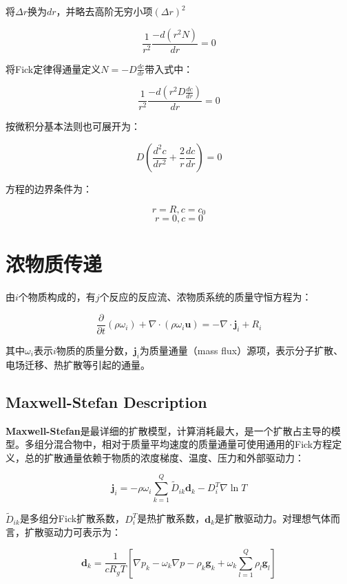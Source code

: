将$ \Delta r $换为$ dr $，并略去高阶无穷小项$ (\Delta r)^2 $

\[ \frac{1}{r^2}\frac{-d\left(r^2 N\right)}{dr} = 0 \]

将Fick定律得通量定义$ N=-D\frac{dc}{dr} $带入式中：

\[ \boxed{\frac{1}{r^2}\frac{-d\left(r^2 D\frac{dc}{dr}\right)}{dr} = 0} \]

按微积分基本法则也可展开为：

\begin{equation}\label{sphere_diffusion}
\boxed{D\left(\frac{d^2c}{dr^2} + \frac{2}{r} \frac{dc}{dr}\right) = 0}
\end{equation}

方程的边界条件为：

\[ r=R, c=c_0 \]
\[ r=0, c=0 \]

\section{浓物质传递}
由$i$个物质构成的，有$j$个反应的反应流、浓物质系统的质量守恒方程为：

\begin{equation}
    \frac{\partial}{\partial t}(\rho\omega_i) + \nabla\cdot(\rho\omega_i\bm{u}) = -\nabla\cdot\bm{j}_i + R_i
\end{equation}

其中$\omega_i$表示$i$物质的质量分数，$\bm{j}_i$为质量通量（mass flux）源项，表示分子扩散、电场迁移、热扩散等引起的通量。

\subsection{Maxwell-Stefan Description}
\textbf{Maxwell-Stefan}是最详细的扩散模型，计算消耗最大，是一个扩散占主导的模型。多组分混合物中，相对于质量平均速度的质量通量可使用通用的Fick方程定义，总的扩散通量依赖于物质的浓度梯度、温度、压力和外部驱动力：

\begin{equation}
    \bm{j}_i = -\rho\omega_i\sum_{k=1}^{Q} \tilde{D}_{ik} \bm{d}_{k} - D_i^T\nabla\ln T
\end{equation}

$\tilde{D}_{ik}$是多组分Fick扩散系数，$D_i^T$是热扩散系数，$\bm{d}_k$是扩散驱动力。对理想气体而言，扩散驱动力可表示为：

\begin{equation}
    \bm{d}_k = \frac{1}{cR_gT} \left[ \nabla p_k-\omega_k\nabla p - \rho_k \bm{g}_k +\omega_k \sum_{l=1}^{Q} \rho_l \bm{g}_l \right]
\end{equation}

